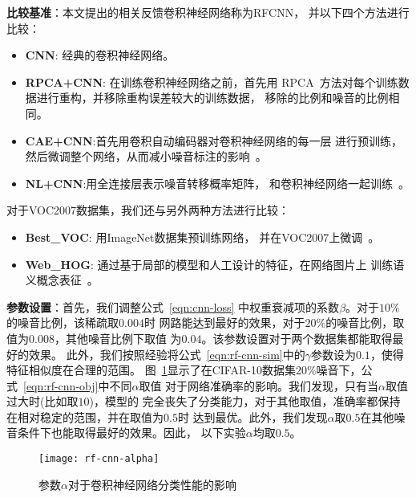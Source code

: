 \textbf{比较基准}：本文提出的相关反馈卷积神经网络称为RFCNN，
并以下四个方法进行比较：
\begin{itemize}
    \item \textbf{CNN}: 经典的卷积神经网络。
    \item \textbf{RPCA+CNN}: 在训练卷积神经网络之前，首先用
        RPCA~\cite{candes2011robust}方法对每个训练数据进行重构，并移除重构误差较大的训练数据，
        移除的比例和噪音的比例相同。
    \item \textbf{CAE+CNN}:首先用卷积自动编码器对卷积神经网络的每一层
        进行预训练，然后微调整个网络，从而减小噪音标注的影响~\cite{luo2012hierarchical}。
    \item \textbf{NL+CNN}:用全连接层表示噪音转移概率矩阵，
        和卷积神经网络一起训练~\cite{sukhbaatar2014training}。
\end{itemize}

对于VOC2007数据集，我们还与另外两种方法进行比较：
\begin{itemize}
    \item \textbf{Best\_VOC}: 用ImageNet数据集预训练网络，
        并在VOC2007上微调~\cite{oquab2014learning}。
    \item \textbf{Web\_HOG}: 通过基于局部的模型和人工设计的特征，在网络图片上
        训练语义概念表征~\cite{divvala2014learning}。
\end{itemize}

\textbf{参数设置}：首先，我们调整公式~\eqref{eqn:cnn-loss}
中权重衰减项的系数$\beta$。对于$10\%$的噪音比例，该稀疏取$0.004$时
网路能达到最好的效果，对于$20\%$的噪音比例，取值为$0.008$，其他噪音比例下取值
为$0.04$。该参数设置对于两个数据集都能取得最好的效果。
此外，我们按照经验将公式~\eqref{eqn:rf-cnn-sim}中的$\gamma$参数设为$0.1$，使得特征相似度在合理的范围。
图~\ref{fig:rf-cnn-alpha}显示了在CIFAR-10数据集$20\%$噪音下，公式~\eqref{eqn:rf-cnn-obj}中不同$\alpha$取值
对于网络准确率的影响。我们发现，只有当$\alpha$取值过大时(比如取$10$)，模型的
完全丧失了分类能力，对于其他取值，准确率都保持在相对稳定的范围，并在取值为$0.5$时
达到最优。此外，我们发现$\alpha$取$0.5$在其他噪音条件下也能取得最好的效果。因此，
以下实验$\alpha$均取$0.5$。
\begin{figure}[ht]
    \center
    \texttt{[image: rf-cnn-alpha]}
    \caption{参数$\alpha$对于卷积神经网络分类性能的影响}\label{fig:rf-cnn-alpha}
\end{figure}


